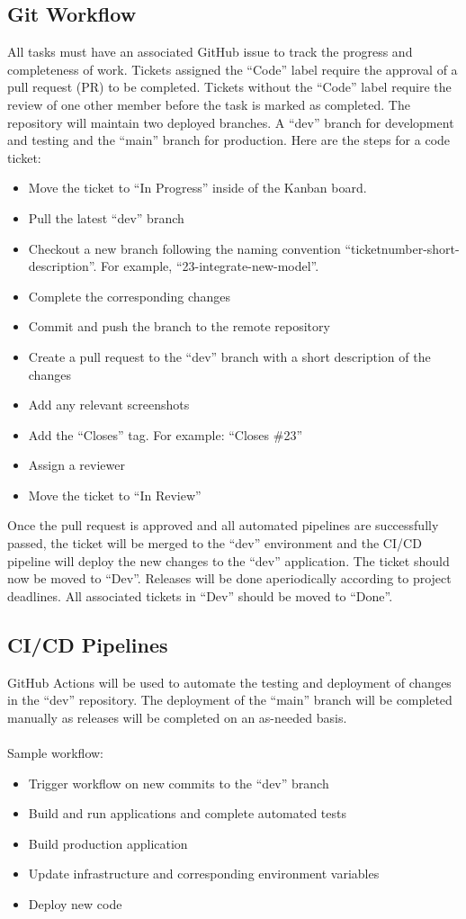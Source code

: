 \documentclass[12pt, titlepage]{article}
\begin{document}
\subsection{Git Workflow}
All tasks must have an associated GitHub issue to track the progress and completeness of
work. Tickets assigned the “Code” label require the approval of a pull request (PR) to be
completed. Tickets without the “Code” label require the review of one other member before the
task is marked as completed.
The repository will maintain two deployed branches. A “dev” branch for development and testing
and the “main” branch for production.
Here are the steps for a code ticket:
\begin{itemize}
\item Move the ticket to “In Progress” inside of the Kanban board.
\item Pull the latest “dev” branch
\item Checkout a new branch following the naming convention
“ticketnumber-short-description”. For example, “23-integrate-new-model”.
\item Complete the corresponding changes
\item Commit and push the branch to the remote repository
\item Create a pull request to the “dev” branch with a short description of the changes
\item Add any relevant screenshots
\item Add the “Closes” tag. For example: “Closes \#23”
\item Assign a reviewer
\item Move the ticket to “In Review”
\end{itemize}

Once the pull request is approved and all automated pipelines are successfully passed, the
ticket will be merged to the “dev” environment and the CI/CD pipeline will deploy the new
changes to the “dev” application. The ticket should now be moved to “Dev”.
Releases will be done aperiodically according to project deadlines. All associated tickets in
“Dev” should be moved to “Done”.
\subsection{CI/CD Pipelines}
GitHub Actions will be used to automate the testing and deployment of changes in the “dev”
repository. The deployment of the “main” branch will be completed manually as releases will be completed
on an as-needed basis.\\\\
Sample workflow:
\begin{itemize}
\item Trigger workflow on new commits to the “dev” branch
\item Build and run applications and complete automated tests
\item Build production application
\item Update infrastructure and corresponding environment variables
\item Deploy new code
\end{itemize}
\end{document}
